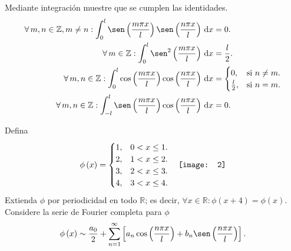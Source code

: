 \question

Mediante integración muestre que se cumplen las identidades.
\begin{align*}
	\forall m,n\in\mathbb{Z},m\neq n:
	\int_{0}^{l}
	\sen
	\left(\frac{m\pi x}{l}\right)
	\sen
	\left(\frac{n\pi x}{l}\right)
	\dl x & =
	0.                                \\
	\forall m\in\mathbb{Z}:
	\int_{0}^{l}
	\sen^{2}
	\left(\frac{m\pi x}{l}\right)
	\dl x & =
	\frac{l}{2}.                      \\
	\forall m,n\in\mathbb{Z}:
	\int_{0}^{l}
	\cos
	\left(\frac{m\pi x}{l}\right)
	\cos
	\left(\frac{n\pi x}{l}\right)
	\dl x & =
	\begin{cases}
		0,           & \text{si }n\neq m. \\
		\frac{l}{2}, & \text{si }n=m.
	\end{cases} \\
	\forall m,n\in\mathbb{Z}:
	\int_{-l}^{l}
	\sen\left(\frac{m\pi x}{l}\right)
	\cos\left(\frac{n\pi x}{l}\right)
	\dl x & =
	0.
\end{align*}

\question

Defina
\begin{equation*}
	\phi\left(x\right)=
	\begin{cases}
		1, & 0<x\leq 1. \\
		2, & 1<x\leq 2. \\
		3, & 2<x\leq 3. \\
		4, & 3<x\leq 4.
	\end{cases}\quad
	\vcenter{\hbox{\texttt{[image: 2]}}}
\end{equation*}
Extienda $\phi$ por periodicidad en todo $\mathbb{R}$; es decir,
\begin{math}
	\forall x\in\mathbb{R}:
	\phi\left(x+4\right)=
	\phi\left(x\right)
\end{math}.
Considere la serie de Fourier completa para $\phi$
\begin{equation*}
	\phi\left(x\right)\sim
	\frac{a_{0}}{2}+
	\sum_{n=1}^{\infty}
	\left[
		a_{n}
		\cos\left(\frac{n\pi x}{l}\right)+
		b_{n}
		\sen
		\left(\frac{n\pi x}{l}\right)
		\right].
\end{equation*}


